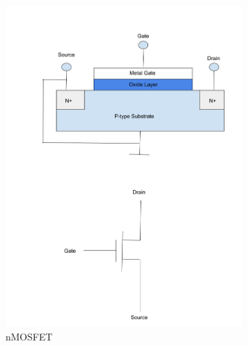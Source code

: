 \documentclass[
  reprint,
  amsmath,amssymb,
  aps
]{revtex4-1}
\begin{document}
\begin{figure}[H]
    \centering
    \begin{subfigure}[b]{0.45\textwidth}
        \includegraphics[width=\linewidth]{nmosfet.png}
        \caption{nMOSFET}
        \label{fig:nmosfet}
    \end{subfigure}
    \begin{subfigure}[b]{0.45\textwidth}

\end{subfigure}
\end{figure}
\end{document}
